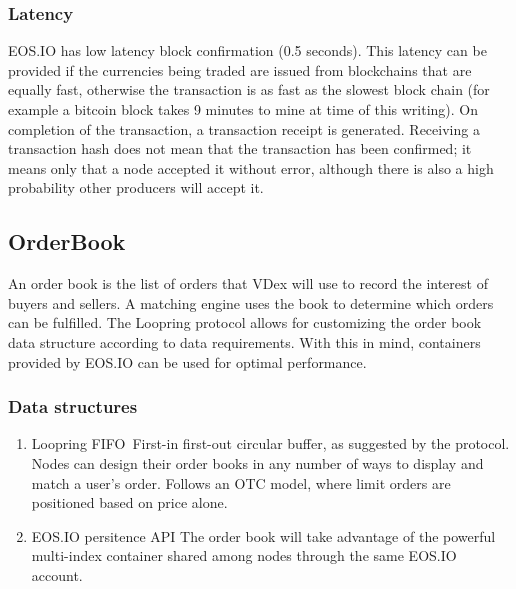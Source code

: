 \documentclass[]{article}
\begin{document}
	\subsubsection{Latency}	
	EOS.IO has low latency block confirmation (0.5 seconds).\cite{3}
	This latency can be provided if the currencies being traded are issued from blockchains that are equally fast, 
	otherwise the transaction is as fast as the slowest block chain
	(for example a bitcoin block takes 9 minutes to mine at time of this writing). 
	On completion of the transaction, a transaction receipt is generated. 
	Receiving a transaction hash does not mean that the transaction has been confirmed; it means only that a node accepted it without error, 
	although there is also a high probability other producers will accept it. 

\subsection{OrderBook}
An order book is the list of orders that VDex will use to record the interest of buyers and sellers. 
A matching engine uses the book to determine which orders can be fulfilled.
The Loopring protocol allows for customizing the order book data structure according to data requirements. \cite{7} 
With this in mind, containers provided by EOS.IO can be used for optimal performance.\cite{25}

\subsubsection{Data structures}
\begin{enumerate}
\item Loopring FIFO\
	First-in first-out circular buffer, as suggested by the protocol. 
	Nodes can design their order books in any number of ways to display and match a user's order. 
	Follows an OTC model, where limit orders are positioned based on price alone.
	\cite{7}  
\item EOS.IO persitence API
	The order book will take advantage of the powerful multi-index container shared among nodes through the same EOS.IO account.
\end{enumerate}
\end{document}
